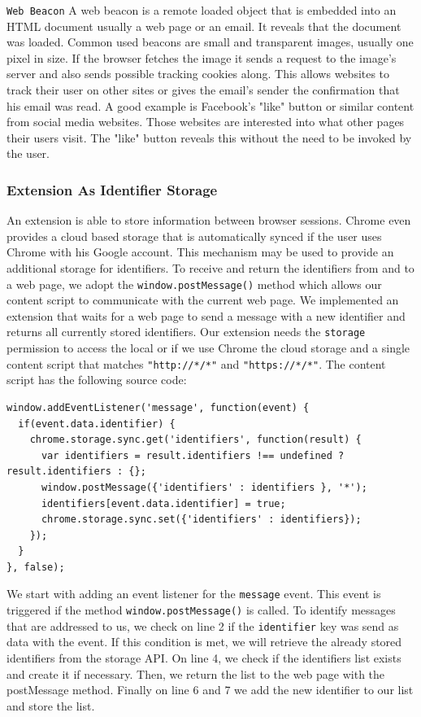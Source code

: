 \documentclass[article,colorback,accentcolor=tud9c,type=bsc]{tudthesis}
\let\stdsubsubsection\subsubsection
\renewcommand\subsubsection{\newpage\stdsubsubsection}
\begin{document}
	\texttt{Web Beacon} A web beacon is a remote loaded object that is embedded into an HTML document usually a web page or an email. It reveals that the document was loaded. Common used beacons are small and transparent images, usually one pixel in size. If the browser fetches the image it sends a request to the image's server and also sends possible tracking cookies along. This allows websites to track their user on other sites or gives the email's sender the confirmation that his email was read. A good example is Facebook's "like" button or similar content from social media websites. Those websites are interested into what other pages their users visit. The "like" button reveals this without the need to be invoked by the user. \\
	
\subsubsection{Extension As Identifier Storage}

	An extension is able to store information between browser sessions. Chrome even provides a cloud based storage that is automatically synced if the user uses Chrome with his Google account. This mechanism may be used to provide an additional storage for identifiers. To receive and return the identifiers from and to a web page, we adopt the \texttt{window.postMessage()} method which allows our content script to communicate with the current web page. We implemented an extension that waits for a web page to send a  message with a new identifier and returns all currently stored identifiers. Our extension needs the \texttt{storage} permission to access the local or if we use Chrome the cloud storage and a single content script that matches \texttt{"http://*/*"} and \texttt{"https://*/*"}. The content script has the following source code: \\
	
	\begin{lstlisting}
window.addEventListener('message', function(event) {
  if(event.data.identifier) {
    chrome.storage.sync.get('identifiers', function(result) {
      var identifiers = result.identifiers !== undefined ? result.identifiers : {};
      window.postMessage({'identifiers' : identifiers }, '*');
      identifiers[event.data.identifier] = true;
      chrome.storage.sync.set({'identifiers' : identifiers});
    });
  }
}, false);
	\end{lstlisting}
	
	We start with adding an event listener for the \texttt{message} event. This event is triggered if the method \texttt{window.postMessage()} is called. To identify messages that are addressed to us, we check on line 2 if the \texttt{identifier} key was send as data with the event. If this condition is met, we will retrieve the already stored identifiers from the storage API. On line 4, we check if the identifiers list exists and create it if necessary. Then, we return the list to the web page with the postMessage method. Finally on line 6 and 7 we add the new identifier to our list and store the list. \\
	
\end{document}
